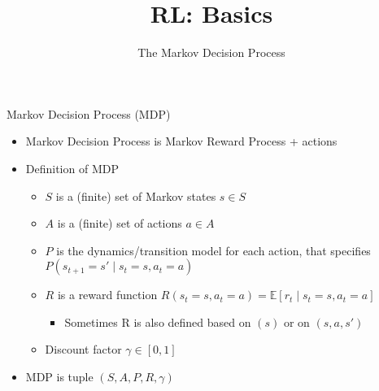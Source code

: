 \documentclass[aspectratio=169]{../latex_main/tntbeamer}  %
\title[Reinforcement Learning: Basics]{RL: Basics}
\subtitle{The Markov Decision Process}
\begin{document}
	
	\maketitle

\begin{frame}[c]{Markov Decision Process (MDP)}

\begin{itemize}
	\item Markov Decision Process is Markov Reward Process + actions
	\item Definition of MDP
	\begin{itemize}
		\item $S$ is a (finite) set of Markov states $s \in S$
		\item $A$ is a (finite) set of actions $a \in A$
		\item $P$ is the dynamics/transition model for each action, that specifies $P(s_{t+1} = s' \mid s_t=s, a_t=a)$
		\item $R$ is a reward function 
		$R(s_t=s, a_t=a) = \mathbb{E}[r_t \mid s_t=s, a_t=a] $
		\begin{itemize}
			\item Sometimes R is also defined based on $(s)$ or on $(s,a,s')$
		\end{itemize}
		\item Discount factor $\gamma \in [0, 1]$
	\end{itemize}
	\item MDP is tuple $(S,A,P, R, \gamma)$
\end{itemize}

\end{frame}
\end{document}
